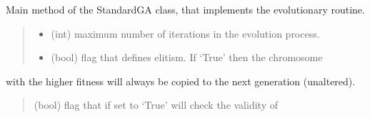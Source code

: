 \documentclass[letterpaper,10pt,english]{sphinxmanual}
\begin{document}
\begin{fulllineitems}
\begin{fulllineitems}
\label{\detokenize{pygenalgo.engines:pygenalgo.engines.standard_ga.StandardGA.run}}
\pysigstartsignatures
{}
\pysigstopsignatures
\sphinxAtStartPar
Main method of the StandardGA class, that implements the evolutionary routine.
\begin{quote}\begin{description}
\begin{itemize}
\item {} 
\sphinxAtStartPar
{} \textendash{} (int) maximum number of iterations in the evolution process.

\item {} 
\sphinxAtStartPar
{} \textendash{} (bool) flag that defines elitism. If ‘True’ then the chromosome

\end{itemize}

\end{description}\end{quote}

\sphinxAtStartPar
with the higher fitness will always be copied to the next generation (unaltered).
\begin{quote}\begin{description}
\sphinxAtStartPar
{} \textendash{} (bool) flag that if set to ‘True’ will check the validity of


\end{description}
\end{quote}
\end{fulllineitems}
\end{fulllineitems}
\end{document}
